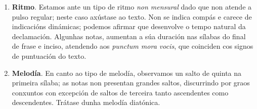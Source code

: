 \documentclass[spanish, a4paper,nobind]{templates/ociamthesis}
\begin{document}
\begin{enumerate}
\def\labelenumi{\arabic{enumi}.}
\item
  \textbf{Ritmo}. Estamos ante un tipo de ritmo \emph{non mensural} dado que non atende a pulso regular; neste caso axústase ao texto. Non se indica compás e carece de indicacións dinámicas; podemos afirmar que desenvolve o tempo natural da declamación. Algunhas notas, aumentan a súa duración nas sílabas do final de frase e inciso, atendendo aos \emph{punctum mora vocis}, que coinciden cos signos de puntuación do texto.
\item
  \textbf{Melodía}. En canto ao tipo de melodía, observamos un salto de quinta na primeira sílaba; as notas non presentan grandes saltos, discurrindo por graos conxuntos con excepción de saltos de terceira tanto ascendentes como descendentes. Trátase dunha melodía diatónica.


\end{enumerate}
\end{document}
